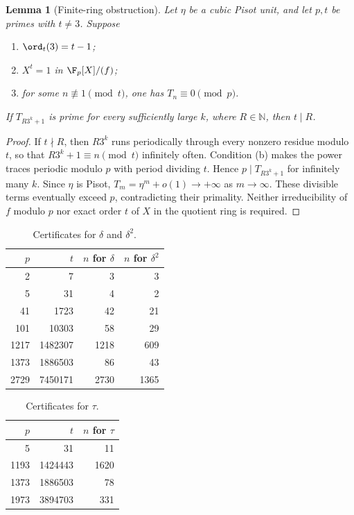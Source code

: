 \documentclass[11pt,a4paper]{article}
\newtheorem{lemma}[theorem]{Lemma}\newtheorem{proposition}[theorem]{Proposition}
\theoremstyle{definition}\newtheorem{definition}[theorem]{Definition}
\theoremstyle{remark}\newtheorem{remark}[theorem]{Remark}
\newcommand{\N}{\mathbb N}\newcommand{\Z}{\mathbb Z}\newcommand{\Q}{\mathbb Q}
\begin{document}
\begin{lemma}[Finite-ring obstruction]\label{P01:lem:finite}
Let $\eta$ be a cubic Pisot unit, and let $p,t$ be primes with
$t\neq3$. Suppose
\begin{enumerate}[label=\textup{(\alph*)}]
\item $\ord_t(3)=t-1$;
\item $X^t=1$ in $\F_p[X]/(f)$;
\item for some $n\not\equiv1\pmod t$, one has $T_n\equiv0\pmod p$.
\end{enumerate}
If $T_{R3^k+1}$ is prime for every sufficiently large $k$, where
$R\in\N$, then $t\mid R$.
\end{lemma}
\begin{proof}
If $t\nmid R$, then $R3^k$ runs periodically through every nonzero
residue modulo $t$, so that $R3^k+1\equiv n\pmod t$ infinitely often.
Condition (b) makes the power traces periodic modulo $p$ with period
dividing $t$. Hence $p\mid T_{R3^k+1}$ for infinitely many $k$.
Since $\eta$ is Pisot,
$T_m=\eta^m+o(1)\longrightarrow+\infty$ as $m\longrightarrow\infty$.
These divisible terms eventually exceed $p$, contradicting their
primality.
Neither irreducibility of $f$ modulo $p$ nor exact order $t$ of $X$
in the quotient ring is required.
\end{proof}

\begin{table}[htbp]
\centering
\begin{tabular}{rrrr}
\toprule
$p$ & $t$ & $n$ for $\delta$ & $n$ for $\delta^2$\\
\midrule
2 & 7 & 3 & 3\\
5 & 31 & 4 & 2\\
41 & 1723 & 42 & 21\\
101 & 10303 & 58 & 29\\
1217 & 1482307 & 1218 & 609\\
1373 & 1886503 & 86 & 43\\
2729 & 7450171 & 2730 & 1365\\
\bottomrule
\end{tabular}
\caption{Certificates for $\delta$ and $\delta^2$.}
\label{P01:tab:delta}
\end{table}

\begin{table}[htbp]
\centering
\begin{tabular}{rrr}
\toprule
$p$ & $t$ & $n$ for $\tau$\\
\midrule
5 & 31 & 11\\
1193 & 1424443 & 1620\\
1373 & 1886503 & 78\\
1973 & 3894703 & 331\\
\bottomrule
\end{tabular}
\caption{Certificates for $\tau$.}
\label{P01:tab:tau}
\end{table}
\end{document}
